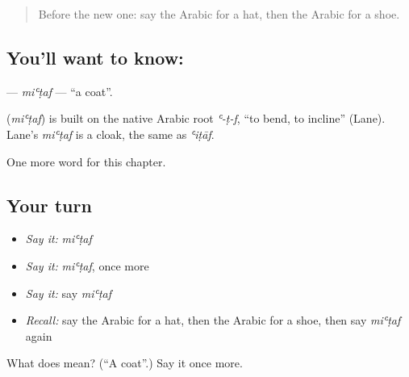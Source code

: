 \label{lesson:AR-C95-mitaf}



\begin{quote}
Before the new one: say the Arabic for a hat, then the Arabic for a shoe.
\end{quote}

\subsection*{You'll want to know: }
\textbf{} — \emph{miʿṭaf} — \textquotedblleft{}a coat\textquotedblright{}.

\begin{cousinweb}
\textbf{} (\emph{miʿṭaf}) is built on the native Arabic root \emph{ʿ-ṭ-f}, \textquotedblleft{}to bend, to incline\textquotedblright{} (Lane). Lane's \emph{miʿṭaf} is a cloak, the same as \emph{ʿiṭāf}.
\end{cousinweb}

\begin{grammarlens}[title={What you've built}]
One more word for this chapter.
\end{grammarlens}

\subsection*{Your turn}
\begin{itemize}
\raggedright
  \item \emph{Say it:} \emph{miʿṭaf}
  \item \emph{Say it:} \emph{miʿṭaf}, once more
  \item \emph{Say it:} say \emph{miʿṭaf}
  \item \emph{Recall:} say the Arabic for a hat, then the Arabic for a shoe, then say \emph{miʿṭaf} again
\end{itemize}

\begin{tcolorbox}[breakable,colback=teal!4,colframe=teal!35!black,title={Before you move on}]
What does  mean? (\textquotedblleft{}A coat\textquotedblright{}.) Say it once more.
\end{tcolorbox}
